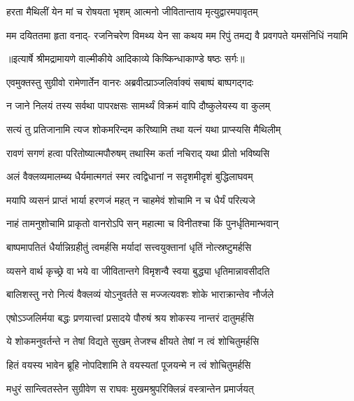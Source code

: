 \twolineshloka
{हरता मैथिलीं येन मां च रोषयता भृशम्}
{आत्मनो जीवितान्ताय मृत्युद्वारमपावृतम्} %

\fourlineindentedshloka
{मम दयिततमा हृता वनाद्-}
{रजनिचरेण विमथ्य येन सा}
{कथय मम रिपुं तमद्य वै}
{प्रवगपते यमसंनिधिं नयामि} %


{॥इत्यार्षे श्रीमद्रामायणे वाल्मीकीये आदिकाव्ये किष्किन्धाकाण्डे षष्ठः सर्गः॥}


\twolineshloka
{एवमुक्तस्तु सुग्रीवो रामेणार्तेन वानरः}
{अब्रवीत्प्राञ्जलिर्वाक्यं सबाष्पं बाष्पगद्गदः} %

\twolineshloka
{न जाने निलयं तस्य सर्वथा पापरक्षसः}
{सामर्थ्यं विक्रमं वापि दौष्कुलेयस्य वा कुलम्} %

\twolineshloka
{सत्यं तु प्रतिजानामि त्यज शोकमरिन्दम}
{करिष्यामि तथा यत्नं यथा प्राप्स्यसि मैथिलीम्} %

\twolineshloka
{रावणं सगणं हत्वा परितोष्यात्मपौरुषम्}
{तथास्मि कर्ता नचिराद् यथा प्रीतो भविष्यसि} %

\twolineshloka
{अलं वैक्लव्यमालम्ब्य धैर्यमात्मगतं स्मर}
{त्वद्विधानां न सदृशमीदृशं बुद्धिलाघवम्} %

\twolineshloka
{मयापि व्यसनं प्राप्तं भार्या हरणजं महत्}
{न चाहमेवं शोचामि न च धैर्यं परित्यजे} %

\twolineshloka
{नाहं तामनुशोचामि प्राकृतो वानरोऽपि सन्}
{महात्मा च विनीतश्चा किं पुनर्धृतिमान्भवान्} %

\twolineshloka
{बाष्पमापतितं धैर्यान्निग्रहीतुं त्वमर्हसि}
{मर्यादां सत्त्वयुक्तानां धृतिं नोत्स्रष्टुमर्हसि} %

\twolineshloka
{व्यसने वार्थ कृच्छ्रे वा भये वा जीवितान्तगे}
{विमृशन्वै स्वया बुद्ध्या धृतिमान्नावसीदति} %

\twolineshloka
{बालिशस्तु नरो नित्यं वैक्लव्यं योऽनुवर्तते}
{स मज्जत्यवशः शोके भाराक्रान्तेव नौर्जले} %

\twolineshloka
{एषोऽञ्जलिर्मया बद्धः प्रणयात्त्वां प्रसादये}
{पौरुषं श्रय शोकस्य नान्तरं दातुमर्हसि} %

\twolineshloka
{ये शोकमनुवर्तन्ते न तेषां विद्यते सुखम्}
{तेजश्च क्षीयते तेषां न त्वं शोचितुमर्हसि} %

\twolineshloka
{हितं वयस्य भावेन ब्रूहि नोपदिशामि ते}
{वयस्यतां पूजयन्मे न त्वं शोचितुमर्हसि} %

\twolineshloka
{मधुरं सान्त्वितस्तेन सुग्रीवेण स राघवः}
{मुखमश्रुपरिक्लिन्नं वस्त्रान्तेन प्रमार्जयत्} %

